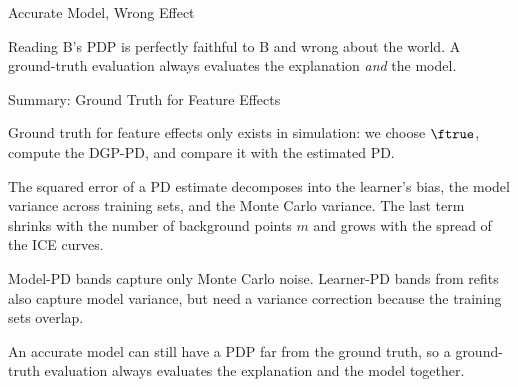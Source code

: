 \documentclass[10pt,compress,t,notes=noshow, xcolor=table]{beamer}
\begin{document}
\begin{framev}[align=mid]{Accurate Model, Wrong Effect}
\spacer[0.4]
\pause
\begin{block}{Reading}
B's PDP is perfectly faithful to B and wrong about the world. A ground-truth evaluation always evaluates the explanation \emph{and} the model.
\end{block}
\end{framev}


\begin{framev}[align=mid]{Summary: Ground Truth for Feature Effects}
\begin{itemizeM}
\item Ground truth for feature effects only exists in simulation: we choose $\ftrue$, compute the DGP-PD, and compare it with the estimated PD.
\item The squared error of a PD estimate decomposes into the learner's bias, the model variance across training sets, and the Monte Carlo variance. The last term shrinks with the number of background points $m$ and grows with the spread of the ICE curves.
\item Model-PD bands capture only Monte Carlo noise. Learner-PD bands from refits also capture model variance, but need a variance correction because the training sets overlap.
\item An accurate model can still have a PDP far from the ground truth, so a ground-truth evaluation always evaluates the explanation and the model together.
\end{itemizeM}
\end{framev}


\endlecture
\end{document}

